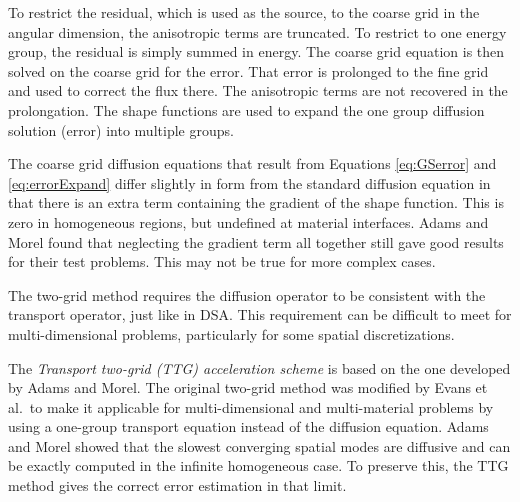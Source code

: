\documentclass[12pt]{article}
\begin{document}
To restrict the residual, which is used as the source, to the coarse grid in the angular dimension, the anisotropic terms are truncated. To restrict to one energy group, the residual is simply summed in energy. The coarse grid equation is then solved on the coarse grid for the error. That error is prolonged to the fine grid and used to correct the flux there. The anisotropic terms are not recovered in the prolongation. The shape functions are used to expand the one group diffusion solution (error) into multiple groups. 

The coarse grid diffusion equations that result from Equations \eqref{eq:GSerror} and \eqref{eq:errorExpand} differ slightly in form from the standard diffusion equation in that there is an extra term containing the gradient of the shape function. This is zero in homogeneous regions, but undefined at material interfaces. Adams and Morel found that neglecting the gradient term all together still gave good results for their test problems. This may not be true for more complex cases.

The two-grid method requires the diffusion operator to be consistent with the transport operator, just like in DSA. This requirement can be difficult to meet for multi-dimensional problems, particularly for some spatial discretizations.%

The \textit{Transport two-grid (TTG) acceleration scheme} is based on the one developed by Adams and Morel. %
%
The original two-grid method was modified by Evans et al.\ to make it applicable for multi-dimensional and multi-material problems by using a one-group transport equation instead of the diffusion equation. Adams and Morel showed that the slowest converging spatial modes are diffusive and can be exactly computed in the infinite homogeneous case. To preserve this, the TTG method gives the correct error estimation in that limit.%
\end{document}
